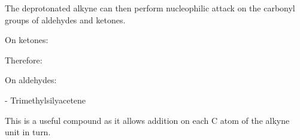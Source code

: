 \begin{enumerate}[label=\alph*)]
\begin{enumerate}[label=\roman*)]
    \end{enumerate}

    The deprotonated alkyne can then perform nucleophilic attack on the
    carbonyl groups of aldehydes and ketones.

    On ketones:


    Therefore:


    On aldehydes:


     - Trimethylsilyacetene

    This is a useful compound as it allows addition on each C atom of the alkyne
    unit in turn.


\end{enumerate}